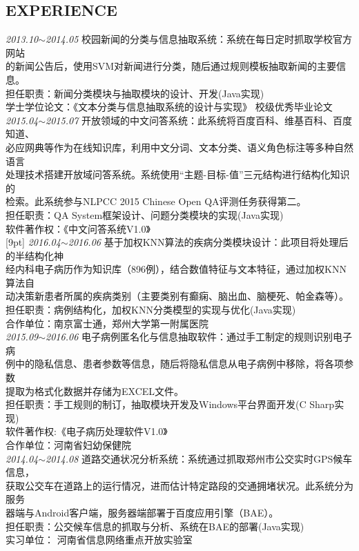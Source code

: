 \documentclass[line, margin]{res}
\newcommand{\xiaowu}{\fontsize{9pt}{15.75pt}\selectfont} %
\begin{document}
\begin{resume}
\section{EXPERIENCE}
 { 
 {\sl 2013.10$\sim$2014.05} 校园新闻的分类与信息抽取系统：{ 系统在每日定时抓取学校官方网站\\
 的新闻公告后，使用SVM对新闻进行分类，随后通过规则模板抽取新闻的主要信息。}\\
 {\xiaowu 担任职责：新闻分类模块与抽取模块的设计、开发(Java实现)}\\
 {\xiaowu 学士学位论文：《文本分类与信息抽取系统的设计与实现》 校级优秀毕业论文} \\
[9pt]
 {\sl 2015.04$\sim$2015.07} 开放领域的中文问答系统：{ 此系统将百度百科、维基百科、百度知道、\\
 必应网典等作为在线知识库，利用中文分词、文本分类、语义角色标注等多种自然语言\\
 处理技术搭建开放域问答系统。系统使用“主题-目标-值”三元结构进行结构化知识的\\
 检索。此系统参与NLPCC 2015 Chinese Open QA评测任务获得第二。}\\
 {\xiaowu 担任职责：QA System框架设计、问题分类模块的实现(Java实现)}\\
 {\xiaowu 软件著作权：《中文问答系统V1.0》} \\
[9pt]
 {\sl 2016.04$\sim$2016.06} 基于加权KNN算法的疾病分类模块设计：{ 此项目将处理后的半结构化神\\
 经内科电子病历作为知识库（896例），结合数值特征与文本特征，通过加权KNN算法自\\
 动决策新患者所属的疾病类别（主要类别有癫痫、脑出血、脑梗死、帕金森等）。\\
 {\xiaowu 担任职责：病例结构化，加权KNN分类模型的实现与优化(Java实现)}\\
 {\xiaowu 合作单位：南京富士通，郑州大学第一附属医院} }\\
[9pt]
 {\sl 2015.09$\sim$2016.06} 电子病例匿名化与信息抽取软件：{ 通过手工制定的规则识别电子病\\
 例中的隐私信息、患者参数等信息，随后将隐私信息从电子病例中移除，将各项参数\\
 提取为格式化数据并存储为EXCEL文件。\\
 {\xiaowu 担任职责：手工规则的制订，抽取模块开发及Windows平台界面开发(C Sharp实现)}\\
 {\xiaowu 软件著作权:《电子病历处理软件V1.0》} \\
 {\xiaowu 合作单位：河南省妇幼保健院} }\\
[9pt]
 {\sl 2014.04$\sim$2014.08} 道路交通状况分析系统：{ 系统通过抓取郑州市公交实时GPS候车信息，\\
 获取公交车在道路上的运行情况，进而估计特定路段的交通拥堵状况。此系统分为服务\\
 器端与Android客户端，服务器端部署于百度应用引擎（BAE）。 \\
 {\xiaowu 担任职责：公交候车信息的抓取与分析、系统在BAE的部署(Java实现)}\\
 {\xiaowu 实习单位： 河南省信息网络重点开放实验室} }\\
 }


\end{resume}
\end{document}
